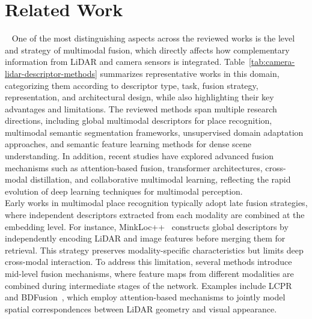 \section{Related Work}~\label{sec:related-works}
One of the most distinguishing aspects across the reviewed works is the level and strategy of multimodal fusion, which directly affects how complementary information from LiDAR and camera sensors is integrated. 
Table~\ref{tab:camera-lidar-descriptor-methods} summarizes representative works in this domain, categorizing them according to descriptor type, task, fusion strategy, representation, and architectural design, while also highlighting their key advantages and limitations. The reviewed methods span multiple research directions, including global multimodal descriptors for place recognition, multimodal semantic segmentation frameworks, unsupervised domain adaptation approaches, and semantic feature learning methods for dense scene understanding. In addition, recent studies have explored advanced fusion mechanisms such as attention-based fusion, transformer architectures, cross-modal distillation, and collaborative multimodal learning, reflecting the rapid evolution of deep learning techniques for multimodal perception. \\
Early works in multimodal place recognition typically adopt late fusion strategies, where independent descriptors extracted from each modality are combined at the embedding level. For instance, MinkLoc++~\cite{komorowski2021minkloclidarmonocularimage} constructs global descriptors by independently encoding LiDAR and image features before merging them for retrieval. This strategy preserves modality-specific characteristics but limits deep cross-modal interaction.
To address this limitation, several methods introduce mid-level fusion mechanisms, where feature maps from different modalities are combined during intermediate stages of the network. Examples include LCPR~\cite{Zhou2023} and BDFusion~\cite{LIANG2025408}, which employ attention-based mechanisms to jointly model spatial correspondences between LiDAR geometry and visual appearance. 

